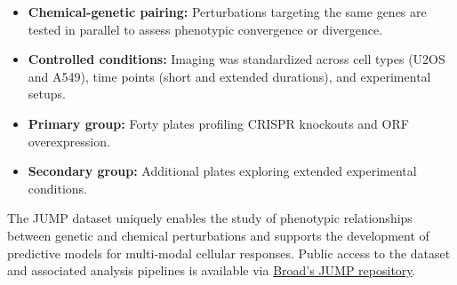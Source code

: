 \begin{itemize}
    \item \textbf{Chemical-genetic pairing:} Perturbations targeting the same genes are tested in parallel to assess phenotypic convergence or divergence.  
    \item \textbf{Controlled conditions:} Imaging was standardized across cell types (U2OS and A549), time points (short and extended durations), and experimental setups.  
    \item \textbf{Primary group:} Forty plates profiling CRISPR knockouts and ORF overexpression.  
    \item \textbf{Secondary group:} Additional plates exploring extended experimental conditions.  
\end{itemize}

The JUMP dataset uniquely enables the study of phenotypic relationships between genetic and chemical perturbations and supports the development of predictive models for multi-modal cellular responses. Public access to the dataset and associated analysis pipelines is available via \href{https://broad.io/cpjump1}{Broad's JUMP repository}.

